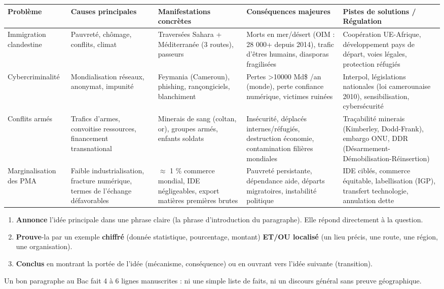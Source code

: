 \documentclass[11pt]{article}
\begin{document}
\begin{center}
\begin{tabularx}{\linewidth}{|l|X|X|X|X|}
\hline
\rowcolor{popblueL} \textbf{Problème} & \textbf{Causes principales} & \textbf{Manifestations concrètes} & \textbf{Conséquences majeures} & \textbf{Pistes de solutions / Régulation} \\
\hline
Immigration clandestine & Pauvreté, chômage, conflits, climat & Traversées Sahara + Méditerranée (3 routes), passeurs & Morts en mer/désert (OIM : 28 000+ depuis 2014), trafic d'êtres humains, diasporas fragilisées & Coopération UE-Afrique, développement pays de départ, voies légales, protection réfugiés \\
\hline
Cybercriminalité & Mondialisation réseaux, anonymat, impunité & Feymania (Cameroun), phishing, rançongiciels, blanchiment & Pertes \num{>10000} Md\$ /an (monde), perte confiance numérique, victimes ruinées & Interpol, législations nationales (loi camerounaise 2010), sensibilisation, cybersécurité \\
\hline
Conflits armés & Trafics d'armes, convoitise ressources, financement transnational & Minerais de sang (coltan, or), groupes armés, enfants soldats & Insécurité, déplacés internes/réfugiés, destruction économie, contamination filières mondiales & Traçabilité minerais (Kimberley, Dodd-Frank), embargo ONU, DDR (Désarmement-Démobilisation-Réinsertion) \\
\hline
Marginalisation des PMA & Faible industrialisation, fracture numérique, termes de l'échange défavorables & $\approx$ 1 \% commerce mondial, IDE négligeables, export matières premières brutes & Pauvreté persistante, dépendance aide, départs migratoires, instabilité politique & IDE ciblés, commerce équitable, labellisation (IGP), transfert technologie, annulation dette \\
\hline
\end{tabularx}
\end{center}

\begin{methode}
\begin{enumerate}
\item \textbf{Annonce} l'idée principale dans une phrase claire (la phrase d'introduction du paragraphe). Elle répond directement à la question.
\item \textbf{Prouve}-la par un exemple \textbf{chiffré} (donnée statistique, pourcentage, montant) \textbf{ET/OU localisé} (un lieu précis, une route, une région, une organisation).
\item \textbf{Conclus} en montrant la portée de l'idée (mécanisme, conséquence) ou en ouvrant vers l'idée suivante (transition).
\end{enumerate}
Un bon paragraphe au Bac fait 4 à 6 lignes manuscrites : ni une simple liste de faits, ni un discours général sans preuve géographique.
\end{methode}
\end{document}
